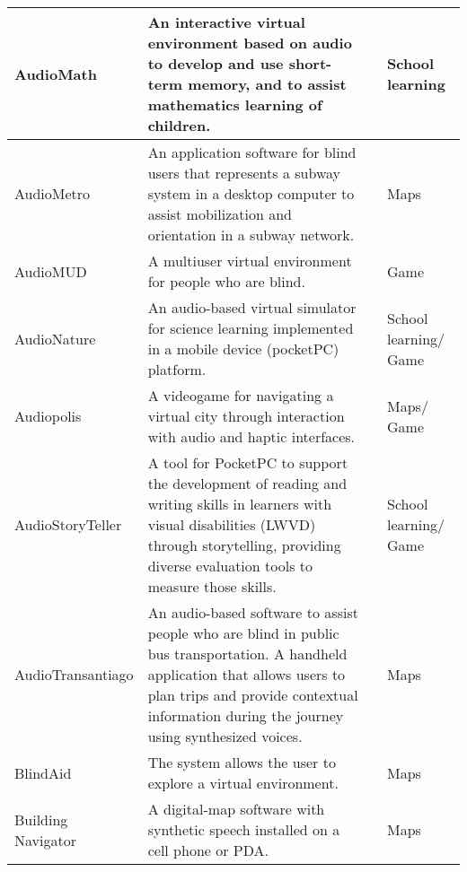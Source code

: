 \begin{small}
\begin{longtable}[h]{m{2.7cm}m{7cm}m{3cm}m{2cm}}
            AudioMath & An interactive virtual environment based on audio to develop and use short-term memory, and to assist mathematics learning of children. & {\tiny \cite{Sanchez2005c}} & School learning \\ \hline
            
            AudioMetro & An application software for blind users that represents a subway system in a desktop computer to assist mobilization and orientation in a subway network. & {\tiny \cite{Sanchez2006}} & Maps \\ \hline
            
            AudioMUD & A multiuser virtual environment for people who are blind. & {\tiny \cite{Sanchez2007a}} & Game \\ \hline
            
            AudioNature & An audio-based virtual simulator for science learning implemented in a mobile device (pocketPC) platform. & {\tiny \cite{Sanchez2008}} & School learning$/$Game \\ \hline
            
            Audiopolis & A videogame for navigating a virtual city through interaction with audio and haptic interfaces. & {\tiny \cite{Sanchez2014a,Sanchez2011,201353,Sanchez2014Multimodal}} & Maps$/$Game \\ \hline
            
            AudioStoryTeller & A tool for PocketPC to support the development of reading and writing skills in learners with visual disabilities (LWVD) through storytelling, providing diverse evaluation tools to measure those skills. & {\tiny \cite{Sancheza}} & School learning$/$Game \\ \hline
            
            AudioTransantiago & An audio-based software to assist people who are blind in public bus transportation. A handheld application that allows users to plan trips and provide contextual information during the journey using synthesized voices. & {\tiny \cite{Sanchez2013,Sanchez2011a}} & Maps \\ \hline
            
            BlindAid & The system allows the user to explore a virtual environment. & {\tiny \cite{201219,Schloerb2015,Lahav2012}} & Maps \\ \hline
            
            Building Navigator & A digital-map software with synthetic speech installed on a cell phone or PDA. & {\tiny \cite{20105}} & Maps \\ \hline
            

\end{longtable}
\end{small}
